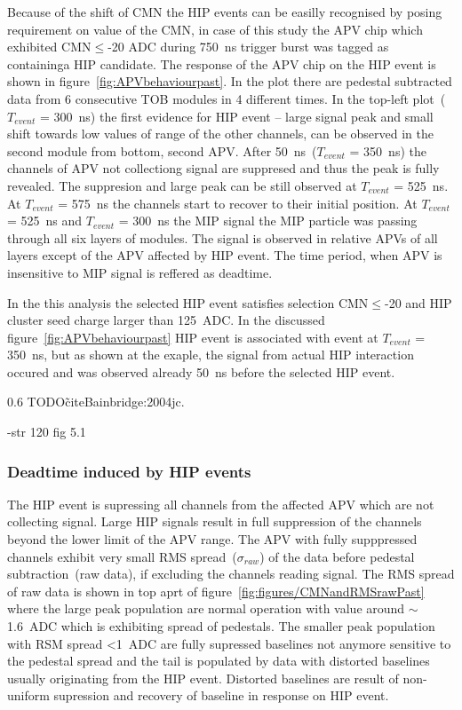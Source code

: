 Because of the shift of CMN the HIP events can be easilly recognised by posing requirement on value of the CMN, in case of this study the APV chip which exhibited CMN$\leq$-20 ADC during 750~ns trigger burst was tagged as containinga  HIP candidate. The response of the APV chip on the HIP event is shown in figure~\ref{fig:APVbehaviourpast}. In the plot there are pedestal subtracted data from 6 consecutive TOB modules in 4 different times. In the top-left plot~($T_{event}$ = 300~ns) the first evidence for HIP event -- large signal peak and small shift towards low values of range of the other channels, can be observed in the second module from bottom, second APV. After 50~ns~($T_{event}$ = 350~ns) the channels of APV not collectiong signal are suppresed and thus the peak is fully revealed. The suppresion and large peak can be still observed at $T_{event}$ = 525~ns. At $T_{event}$ = 575~ns the channels start to recover to their initial position. At $T_{event}$ = 525~ns and $T_{event}$ = 300~ns the MIP signal the MIP particle was passing through all six layers of modules. The signal is observed in relative APVs of all layers except of the APV affected by HIP event. The time period, when APV is insensitive to MIP signal is reffered as deadtime.

In the this analysis the selected HIP event satisfies selection CMN$\leq$-20 and HIP cluster seed charge larger than 125~ADC.  In the discussed figure~\ref{fig:APVbehaviourpast} HIP event is associated with event at $T_{event}$ = 350~ns, but as shown at the exaple, the signal from actual HIP interaction occured and was observed already 50~ns before the selected HIP event.

                 {0.6}       %
                 {TODO\~cite{Bainbridge:2004jc}.} %

-str 120  fig 5.1



\subsubsection{Deadtime induced by HIP events}

The HIP event is supressing all channels from the affected APV which are not collecting signal. Large HIP signals result in full suppression of the channels beyond the lower limit of the APV range. The APV with fully supppressed channels exhibit very small RMS spread~($\sigma_{raw}$) of the data before pedestal subtraction~(raw data), if excluding the channels reading signal. The RMS spread of raw data is shown in top aprt of figure~\ref{fig:figures/CMNandRMSrawPast} where the large peak population are normal operation with value around $\sim$1.6~ADC which is exhibiting spread of pedestals. The smaller peak population with RSM spread <1~ADC are fully supressed baselines not anymore sensitive to the pedestal spread and the tail is populated by data with distorted baselines usually originating from the HIP event. Distorted baselines are result of non-uniform supression and recovery of baseline in response on HIP event.

